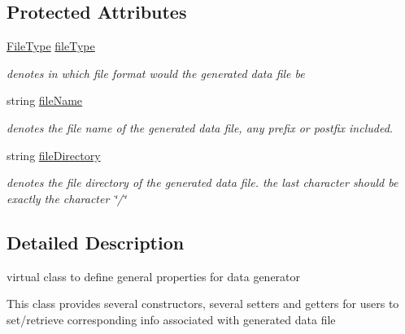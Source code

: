 \subsection*{\-Protected \-Attributes}
\begin{DoxyCompactItemize}
\item 
\hypertarget{classDataGenerator_a4f4d384cfa418e73e3cb948968398e1a}{\hyperlink{FileType_8h_a2c794c5c13ab4dd7e65bad031dbe41c3}{\-File\-Type} \hyperlink{classDataGenerator_a4f4d384cfa418e73e3cb948968398e1a}{file\-Type}}\label{classDataGenerator_a4f4d384cfa418e73e3cb948968398e1a}

\begin{DoxyCompactList}\small\item\em denotes in which file format would the generated data file be \end{DoxyCompactList}\item 
\hypertarget{classDataGenerator_a0bfe4164d57ad70cdf91a63770bb5317}{string \hyperlink{classDataGenerator_a0bfe4164d57ad70cdf91a63770bb5317}{file\-Name}}\label{classDataGenerator_a0bfe4164d57ad70cdf91a63770bb5317}

\begin{DoxyCompactList}\small\item\em denotes the file name of the generated data file, any prefix or postfix included. \end{DoxyCompactList}\item 
\hypertarget{classDataGenerator_a4ed887b424833bb723d105983c61023d}{string \hyperlink{classDataGenerator_a4ed887b424833bb723d105983c61023d}{file\-Directory}}\label{classDataGenerator_a4ed887b424833bb723d105983c61023d}

\begin{DoxyCompactList}\small\item\em denotes the file directory of the generated data file. the last character should be exactly the character \char`\"{}/\char`\"{} \end{DoxyCompactList}\end{DoxyCompactItemize}


\subsection{\-Detailed \-Description}
virtual class to define general properties for data generator 

\-This class provides several constructors, several setters and getters for users to set/retrieve corresponding info associated with generated data file 


